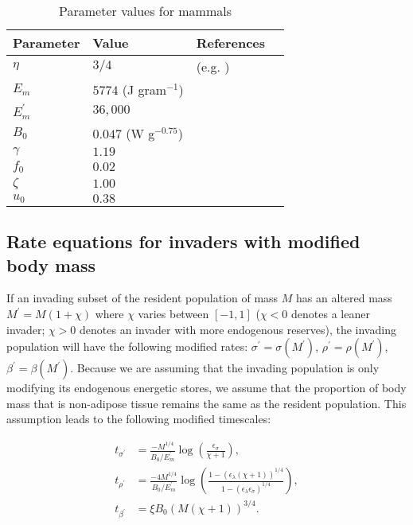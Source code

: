 \documentclass{pnastwo}
\begin{document}
\begin{article}
 \begin{table}[h]
\caption{Parameter values for mammals}
\label{param}
    \begin{center}
    \small
     \begin{tabular}{ p{1.2cm} p{3.2cm} l p{2.2cm}|}
     \hline
     Parameter & Value & References  \\
     \hline
   $\eta$ & $3/4$  &  (e.g. \cite{West:2001bv,moses2008rmo,hou}) \\ 
   $E_{m}$ & $5774$ (J gram$^{-1}$)  &  \cite{moses2008rmo,West:2001bv,hou} \\ 
   $E_{m}^{\prime}$ & $36,000$  & \cite{stryer,hou} \\ 
   $B_{0}$ & $0.047$ (W g$^{-0.75}$)    & \cite{hou}  \\
   $\gamma$ & $1.19$ & \cite{Lindstedt:1985hm} \\ 
   $f_{0}$ & $0.02$ & \cite{Lindstedt:1985hm}\\ 
   $\zeta$ & $1.00$  & \cite{Lindstedt:2002td} \\ 
   $u_{0}$ & $0.38$  & \cite{Lindstedt:2002td} \\ 
      
   \hline
    \end{tabular}
    \end{center}
   \end{table}


\subsection*{Rate equations for invaders with modified body mass}
If an invading subset of the resident population of mass $M$ has an altered mass $M^\prime = M(1+\chi)$ where $\chi$ varies between $[-1,1]$ ($\chi<0$ denotes a leaner invader; $\chi > 0$ denotes an invader with more endogenous reserves), the invading population will have the following modified rates: $\sigma^\prime = \sigma(M^\prime)$, $\rho^\prime = \rho(M^\prime)$, $\beta^\prime = \beta(M^\prime)$.
Because we are assuming that the invading population is only modifying its endogenous energetic stores, we assume that the proportion of body mass that is non-adipose tissue remains the same as the resident population.
This assumption leads to the following modified timescales:

\begin{align}
t_{\sigma^\prime} &= \frac{-M^{1/4}}{B_0/E_m^\prime}\log \left(\frac{\epsilon_\sigma}{\chi +1}\right), \\ \nonumber
t_{\rho^\prime} &= \frac{-4 M^{1/4} }{B_0/E_m^\prime}\log \left(\frac{1-( \epsilon_\lambda(\chi +1))^{1/4}}{1-(\epsilon_\lambda \epsilon_\sigma)^{1/4}}\right), \\ \nonumber
t_{\beta^\prime} &= \xi B_0\left(M(\chi + 1)\right)^{3/4}.
\end{align}





\end{article}
\end{document}

